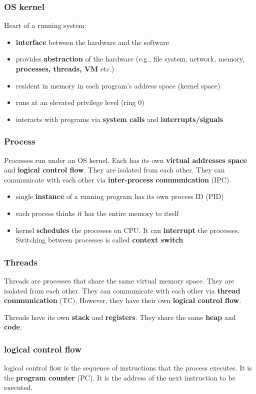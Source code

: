 \documentclass[letterpaper,12pt]{article}
\begin{document}
\subsubsection{OS kernel}
Heart of a running system:\begin{itemize}
    \item \textbf{interface} between the hardware and the software
    \item provides \textbf{abstraction} of the hardware (e.g., file system, network,
          memory, \textbf{processes, threads, VM} etc.)
    \item resident in memory in each program's address space (kernel space)
    \item runs at an elevated privilege level (ring 0)
    \item interacts with programs via \textbf{system calls} and
          \textbf{interrupts/signals}
\end{itemize}
\subsubsection{Process}
Processes run under an OS kernel. Each has its own \textbf{virtual addresses
    space} and \textbf{logical control flow}. They are isolated from each other.
They can communicate with each other via \textbf{inter-process communication}
(IPC).

\begin{itemize}
    \item single \textbf{instance} of a running program has its own process ID (PID)
    \item each process thinks it has the entire memory to itself
    \item kernel \textbf{schedules} the processes on CPU. It can \textbf{interrupt} the
          processes. Switching between processes is called \textbf{context switch}
\end{itemize}
\subsubsection{Threads}
Threads are processes that share the same virtual memory space. They are
isolated from each other. They can communicate with each other via
\textbf{thread communication} (TC). However, they have their own
\textbf{logical control flow}.

Threads have its own \textbf{stack} and \textbf{registers}. They share the same
\textbf{heap} and \textbf{code}.
\subsubsection{logical control flow}
logical control flow is the sequence of instructions that the process executes.
It is the \textbf{program counter} (PC). It is the address of the next
instruction to be executed.
\end{document}
